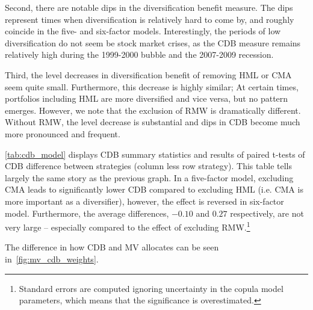 Second, there are notable dips in the diversification benefit measure. The dips represent times when diversification is relatively hard to come by, and roughly coincide in the five- and six-factor models. Interestingly, the periods of low diversification do not seem be stock market crises, as the CDB measure remains relatively high during the 1999-2000 bubble and the 2007-2009 recession.

Third, the level decreases in diversification benefit of removing HML or CMA seem quite small. Furthermore, this decrease is highly similar; At certain times, portfolios including HML are more diversified and vice versa, but no pattern emerges. However, we note that the exclusion of RMW is dramatically different. Without RMW, the level decrease is substantial and dips in CDB become much more pronounced and frequent. 



\autoref{tab:cdb_model} displays CDB summary statistics and results of paired t-tests of CDB difference between strategies (column less row strategy). This table tells largely the same story as the previous graph. In a five-factor model, excluding CMA leads to significantly lower CDB compared to excluding HML (i.e. CMA is more important as a diversifier), however, the effect is reversed in six-factor model. Furthermore, the average differences, $-0.10$ and $0.27$ respectively, are not very large -- especially compared to the effect of excluding RMW.\footnote{Standard errors are computed ignoring uncertainty in the copula model parameters, which means that the significance is overestimated.}

The difference in how CDB and MV allocates can be seen in~\autoref{fig:mv_cdb_weights}.

